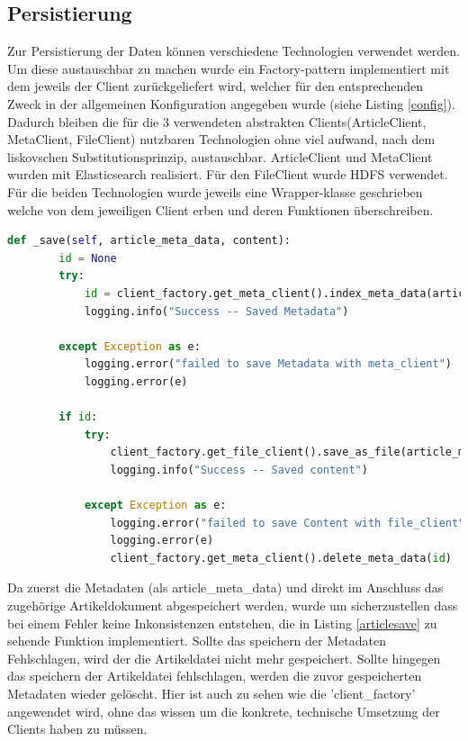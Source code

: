 \documentclass[12pt,oneside,a4paper,parskip]{scrbook}
\begin{document}
\subsection{Persistierung}
Zur Persistierung der Daten können verschiedene Technologien verwendet werden. Um diese austauschbar zu machen wurde ein Factory-pattern implementiert mit dem jeweils der Client zurückgeliefert wird, welcher für den entsprechenden Zweck in der allgemeinen Konfiguration angegeben wurde (siehe Listing \ref{config}). Dadurch bleiben die für die 3 verwendeten abstrakten Clients(ArticleClient, MetaClient, FileClient) nutzbaren Technologien ohne viel aufwand, nach dem liskovschen Substitutionsprinzip, austauschbar. ArticleClient und MetaClient  wurden mit Elasticsearch realisiert. Für den FileClient wurde HDFS verwendet. Für die beiden Technologien wurde jeweils eine Wrapper-klasse geschrieben welche von dem jeweiligen Client erben und deren Funktionen überschreiben. 
\begin{lstlisting}[basicstyle=\small, caption=Funktion zum Speichern der Daten, label=articlesave,language=python]
    def _save(self, article_meta_data, content):
        id = None
        try:
            id = client_factory.get_meta_client().index_meta_data(article_meta_data)  
            logging.info("Success -- Saved Metadata")

        except Exception as e:
            logging.error("failed to save Metadata with meta_client") 
            logging.error(e)

        if id:
            try:
                client_factory.get_file_client().save_as_file(article_meta_data["filepath"], article_meta_data["filename"], content)
                logging.info("Success -- Saved content")

            except Exception as e:
                logging.error("failed to save Content with file_client")
                logging.error(e)
                client_factory.get_meta_client().delete_meta_data(id)

\end{lstlisting}
Da zuerst die Metadaten (als article\_meta\_data) und direkt im Anschluss das zugehörige Artikeldokument abgespeichert werden, wurde um sicherzustellen dass bei einem Fehler keine Inkonsistenzen entstehen, die in Listing \ref{articlesave} zu sehende Funktion implementiert. Sollte das speichern der Metadaten Fehlschlagen, wird der die Artikeldatei nicht mehr gespeichert. Sollte hingegen das speichern der Artikeldatei fehlschlagen, werden die zuvor gespeicherten Metadaten wieder gelöscht. Hier ist auch zu sehen wie die 'client\_factory' angewendet wird, ohne das wissen um die konkrete, technische Umsetzung der Clients haben zu müssen.
\pagebreak
\end{document}
